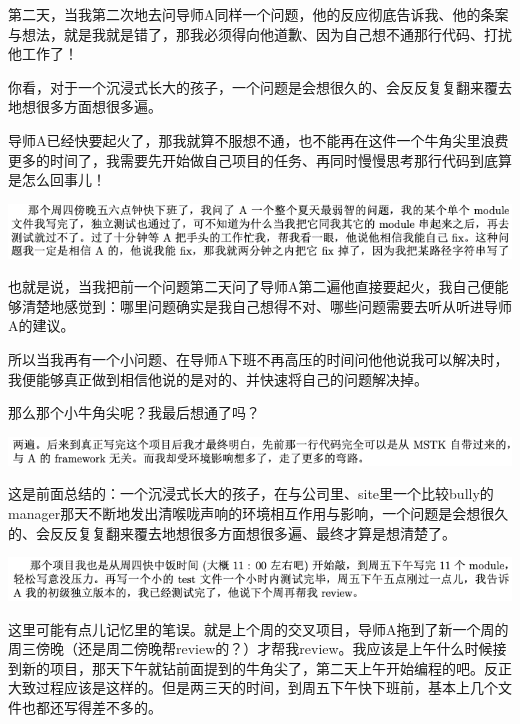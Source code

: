 \documentclass[9pt, b5paper]{article}
\begin{document}
第二天，当我第二次地去问导师A同样一个问题，他的反应彻底告诉我、他的条案与想法，就是我就是错了，那我必须得向他道歉、因为自己想不通那行代码、打扰他工作了！

你看，对于一个沉浸式长大的孩子，一个问题是会想很久的、会反反复复翻来覆去地想很多方面想很多遍。

导师A已经快要起火了，那我就算不服想不通，也不能再在这件一个牛角尖里浪费更多的时间了，我需要先开始做自己项目的任务、再同时慢慢思考那行代码到底算是怎么回事儿！

\begin{center}
\includegraphics[width=.9\linewidth]{./pic/backups_plans_20210512_202454.png}
\end{center}

也就是说，当我把前一个问题第二天问了导师A第二遍他直接要起火，我自己便能够清楚地感觉到：哪里问题确实是我自己想得不对、哪些问题需要去听从听进导师A的建议。

所以当我再有一个小问题、在导师A下班不再高压的时间问他他说我可以解决时，我便能够真正做到相信他说的是对的、并快速将自己的问题解决掉。 

那么那个小牛角尖呢？我最后想通了吗？

\begin{center}
\includegraphics[width=.9\linewidth]{./pic/backups_plans_20210512_202735.png}
\end{center}

这是前面总结的：一个沉浸式长大的孩子，在与公司里、site里一个比较bully的manager那天不断地发出清喉咙声响的环境相互作用与影响，一个问题是会想很久的、会反反复复翻来覆去地想很多方面想很多遍、最终才算是想清楚了。

\begin{center}
\includegraphics[width=.9\linewidth]{./pic/backups_plans_20210512_203057.png}
\end{center}

这里可能有点儿记忆里的笔误。就是上个周的交叉项目，导师A拖到了新一个周的周三傍晚（还是周二傍晚帮review的？）才帮我review。我应该是上午什么时候接到新的项目，那天下午就钻前面提到的牛角尖了，第二天上午开始编程的吧。反正大致过程应该是这样的。但是两三天的时间，到周五下午快下班前，基本上几个文件也都还写得差不多的。 
\end{document}
